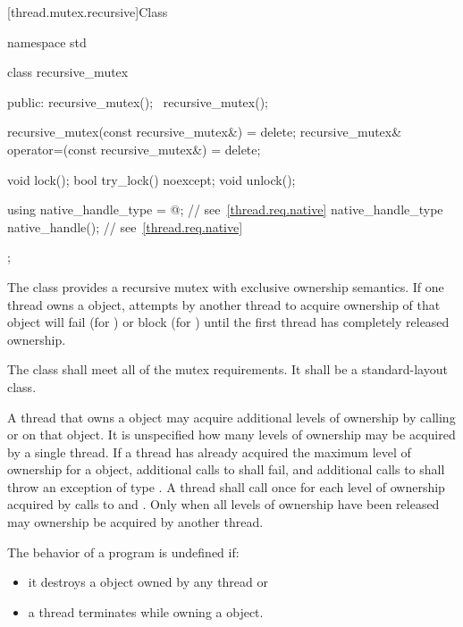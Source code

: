 [thread.mutex.recursive]{Class }

%
\begin{codeblock}
namespace std {
  class recursive_mutex {
  public:
    recursive_mutex();
    ~recursive_mutex();

    recursive_mutex(const recursive_mutex&) = delete;
    recursive_mutex& operator=(const recursive_mutex&) = delete;

    void lock();
    bool try_lock() noexcept;
    void unlock();

    using native_handle_type = @\impdefnc@;          // see~\ref{thread.req.native}
    native_handle_type native_handle();                         // see~\ref{thread.req.native}
  };
}
\end{codeblock}

\pnum
The class  provides a recursive mutex with exclusive ownership
semantics. If one thread owns a  object, attempts by another
thread to acquire ownership of that object will fail (for ) or block
(for ) until the first thread has completely released ownership.

\pnum
The class  shall meet all of the mutex
requirements. It shall be a standard-layout
class.

\pnum
A thread that owns a  object may acquire additional levels of
ownership by calling  or  on that object. It is
unspecified how many levels of ownership may be acquired by a single thread. If a thread
has already acquired the maximum level of ownership for a 
object, additional calls to  shall fail, and additional calls to
 shall throw an exception of type . A thread
shall call  once for each level of ownership acquired by calls to
 and . Only when all levels of ownership have been
released may ownership be acquired by another thread.

\pnum
The behavior of a program is undefined if:
\begin{itemize}
\item it destroys a  object owned by any thread or
\item a thread terminates while owning a  object.
\end{itemize}

